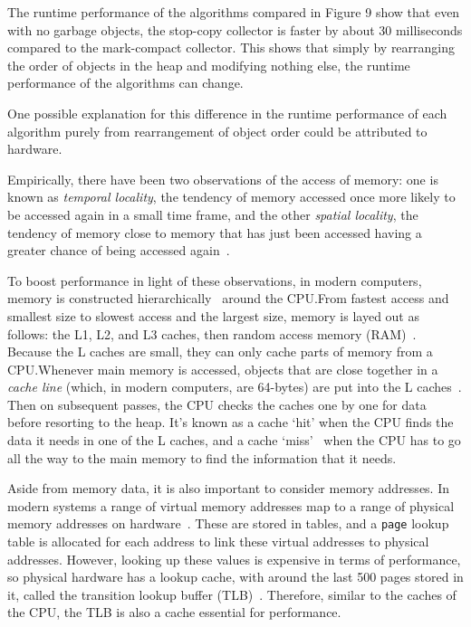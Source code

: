 \documentclass[index]{subfiles}
\begin{document}
The runtime performance of the algorithms compared in Figure 9 show that even with no garbage objects, the stop-copy collector is faster by about 30 milliseconds compared to the mark-compact collector. This shows that simply by rearranging the order of objects in the heap and modifying nothing else, the runtime performance of the algorithms can change.

One possible explanation for this difference in the runtime performance of each algorithm purely from rearrangement of object order could be attributed to hardware.

Empirically, there have been two observations of the access of memory: one is known as \textit{temporal locality}, the tendency of memory accessed once more likely to be accessed again in a small time frame, and the other \textit{spatial locality}, the tendency of memory close to memory that has just been accessed having a greater chance of being accessed again~\parencite[18:21]{oracledevelopersCachingUnderstandMeasure2015}.

To boost performance in light of these observations, in modern computers, memory is constructed hierarchically~\parencite{simondevCanJavaScriptGo2021} around the CPU.\@ From fastest access and smallest size to slowest access and the largest size, memory is layed out as follows: the L1, L2, and L3 caches, then random access memory (RAM)~\parencite{simondevCanJavaScriptGo2021}. Because the L caches are small, they can only cache parts of memory from a CPU.\@ Whenever main memory is accessed, objects that are close together in a \textit{cache line} (which, in modern computers, are 64-bytes) are put into the L caches~\parencites{simondevCanJavaScriptGo2021}{code_project}. Then on subsequent passes, the CPU checks the caches one by one for data before resorting to the heap. It's known as a cache `hit' when the CPU finds the data it needs in one of the L caches, and a cache `miss'~\parencite{simondevCanJavaScriptGo2021} when the CPU has to go all the way to the main memory to find the information that it needs.

Aside from memory data, it is also important to consider memory addresses. In modern systems a range of virtual memory addresses map to a range of physical memory addresses on hardware~\parencites{code_project}[31:29]{oracledevelopersCachingUnderstandMeasure2015}. These are stored in tables, and a \verb+page+ lookup table is allocated for each address to link these virtual addresses to physical addresses. However, looking up these values is expensive in terms of performance, so physical hardware has a lookup cache, with around the last 500 pages stored in it, called the transition lookup buffer (TLB)~\parencites{code_project}[32:42]{oracledevelopersCachingUnderstandMeasure2015}. Therefore, similar to the caches of the CPU, the TLB is also a cache essential for performance.
\end{document}

